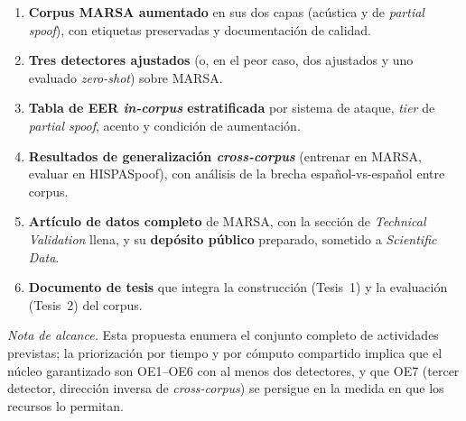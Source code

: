 \documentclass[11pt]{article}
\begin{document}
\begin{enumerate}[label=\textbf{RE\arabic*.},leftmargin=2.6em]
  \item \textbf{Corpus MARSA aumentado} en sus dos capas (ac\'ustica y de
  \emph{partial spoof}), con etiquetas preservadas y documentaci\'on de
  calidad.
  \item \textbf{Tres detectores ajustados} (o, en el peor caso, dos
  ajustados y uno evaluado \emph{zero-shot}) sobre MARSA.
  \item \textbf{Tabla de EER \emph{in-corpus} estratificada} por sistema
  de ataque, \emph{tier} de \emph{partial spoof}, acento y condici\'on de
  aumentaci\'on.
  \item \textbf{Resultados de generalizaci\'on \emph{cross-corpus}}
  (entrenar en MARSA, evaluar en HISPASpoof), con an\'alisis de la brecha
  espa\~nol-vs-espa\~nol entre corpus.
  \item \textbf{Art\'iculo de datos completo} de MARSA, con la secci\'on de
  \emph{Technical Validation} llena, y su \textbf{dep\'osito p\'ublico}
  preparado, sometido a \emph{Scientific Data}.
  \item \textbf{Documento de tesis} que integra la construcci\'on
  (Tesis~1) y la evaluaci\'on (Tesis~2) del corpus.
\end{enumerate}

\noindent\emph{Nota de alcance.} Esta propuesta enumera el conjunto
completo de actividades previstas; la priorizaci\'on por tiempo y por
c\'omputo compartido implica que el n\'ucleo garantizado son OE1--OE6 con
al menos dos detectores, y que OE7 (tercer detector, direcci\'on inversa
de \emph{cross-corpus}) se persigue en la medida en que los recursos lo
permitan.
\end{document}

